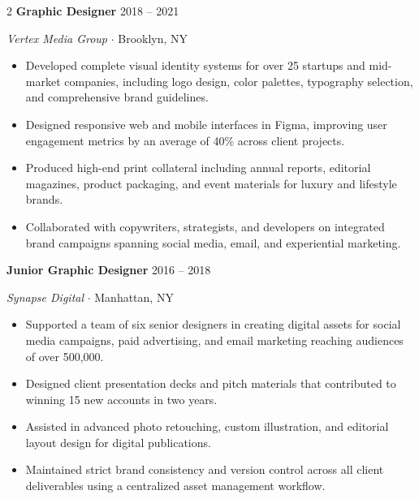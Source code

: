 \documentclass[10pt,a4paper]{article}
\begin{document}
\begin{paracol}{2}
    {\large\bfseries\color{primary} Graphic Designer}
    \hfill
    {\small\color{graytext} 2018 -- 2021}\par
    {\itshape Vertex Media Group}
    {\color{accent}$\cdot$}
    Brooklyn, NY\par
    \vspace{4pt}
    \begin{itemize}
      \item Developed complete visual identity systems for over 25 startups
            and mid-market companies, including logo design, color palettes,
            typography selection, and comprehensive brand guidelines.
      \item Designed responsive web and mobile interfaces in Figma, improving
            user engagement metrics by an average of 40\% across client
            projects.
      \item Produced high-end print collateral including annual reports,
            editorial magazines, product packaging, and event materials
            for luxury and lifestyle brands.
      \item Collaborated with copywriters, strategists, and developers on
            integrated brand campaigns spanning social media, email, and
            experiential marketing.
    \end{itemize}
    \vspace{10pt}

    {\large\bfseries\color{primary} Junior Graphic Designer}
    \hfill
    {\small\color{graytext} 2016 -- 2018}\par
    {\itshape Synapse Digital}
    {\color{accent}$\cdot$}
    Manhattan, NY\par
    \vspace{4pt}
    \begin{itemize}
      \item Supported a team of six senior designers in creating digital
            assets for social media campaigns, paid advertising, and
            email marketing reaching audiences of over 500,000.
      \item Designed client presentation decks and pitch materials that
            contributed to winning 15 new accounts in two years.
      \item Assisted in advanced photo retouching, custom illustration,
            and editorial layout design for digital publications.
      \item Maintained strict brand consistency and version control across
            all client deliverables using a centralized asset management
            workflow.
    \end{itemize}


\end{paracol}
\end{document}

